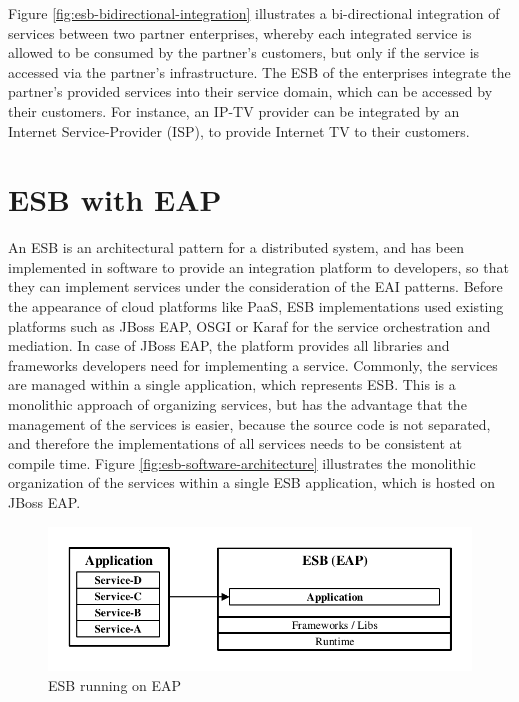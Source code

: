 Figure \vref{fig:esb-bidirectional-integration} illustrates a bi-directional integration of services between two partner enterprises, whereby each integrated service is allowed to be consumed by the partner's customers, but only if the service is accessed via the partner's infrastructure. The ESB of the enterprises integrate the partner's provided services into their service domain, which can be accessed by their customers. For instance, an IP-TV provider can be integrated by an Internet Service-Provider (ISP), to provide Internet TV to their customers. 

\section{ESB with EAP}
\label{sec:esb-as-software}
An ESB is an architectural pattern for a distributed system, and has been implemented in software to provide an integration platform to developers, so that they can implement services under the consideration of the EAI patterns. Before the appearance of cloud platforms like PaaS, ESB implementations used existing platforms such as JBoss EAP, OSGI or Karaf for the service orchestration and mediation. In case of JBoss EAP, the platform provides all libraries and frameworks developers need for implementing a service. Commonly, the services are managed within a single application, which represents ESB. This is a monolithic approach of organizing services, but has the advantage that the management of the services is easier, because the source code is not separated, and therefore the implementations of all services needs to be consistent at compile time. Figure \vref{fig:esb-software-architecture} illustrates the monolithic organization of the services within a single ESB application, which is hosted on JBoss EAP.

\begin{figure}[htbp]
	\centering
	\includegraphics[scale=1]{images/esb-software-architecture.pdf}
	\caption{ESB running on EAP}
	\label{fig:esb-software-architecture}
\end{figure} 

